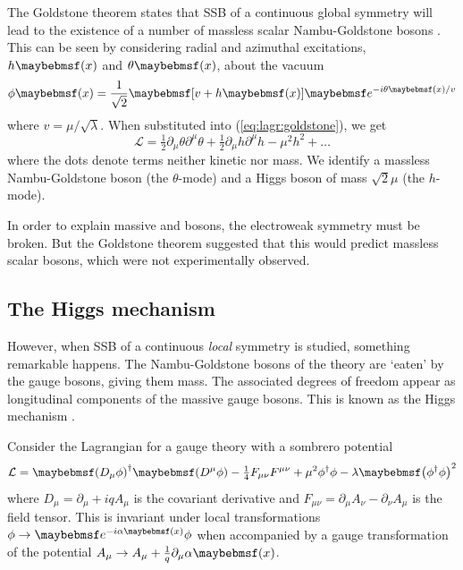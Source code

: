 The Goldstone theorem states that \ac{SSB} of a continuous global symmetry will lead to 
the existence of a number of massless scalar Nambu-Goldstone bosons \cite{Goldstone:1962}.
This can be seen by considering radial and azimuthal excitations, $h\parenths{x}$ and 
$\theta\parenths{x}$, about the vacuum 
\begin{equation}
	\phi\parenths{x} = \frac{1}{\sqrt{2}} \sqbracs{v + h\parenths{x}} \eexp{-i\theta\parenths{x} / v}
\end{equation}
where $v = \mu/\sqrt{\lambda}$. When substituted into (\ref{eq:lagr:goldstone}), we get
\begin{equation}
	\mathcal{L} = \tfrac{1}{2}\partial_{\mu}\theta \partial^{\mu}\theta
	+ \tfrac{1}{2}\partial_{\mu}h \partial^{\mu}h
	- \mu^2 h^2
	+ \dots
\end{equation}
where the dots denote terms neither kinetic nor mass. 
We identify a massless Nambu-Goldstone boson (the $\theta$-mode) and a Higgs boson of 
mass $\sqrt{2}\mu$ (the $h$-mode).

In order to explain massive \PWpm and \PZ bosons, the electroweak symmetry must be broken.
But the Goldstone theorem suggested that this would predict massless scalar bosons, which
were not experimentally observed.



\subsection{The Higgs mechanism}
\label{sec:ewsb:higgs}
However, when \ac{SSB} of a continuous \textit{local} symmetry is studied, something 
remarkable happens. The Nambu-Goldstone bosons of the theory are `eaten' by the gauge 
bosons, giving them mass. The associated degrees of freedom appear as longitudinal 
components of the massive gauge bosons. This is known as the Higgs mechanism 
\cite{Englert:1964,Higgs:1964a,Higgs:1964b,Guralnik:1964,Higgs:1966}.

Consider the Lagrangian for a  gauge theory with a sombrero potential
\begin{equation}
	\mathcal{L} 
	= \parenths{D_{\mu}\phi}^{\dagger} \parenths{D^{\mu}\phi}
	- \tfrac{1}{4} F_{\mu\nu} F^{\mu\nu}
	+ \mu^2 \phi^{\dagger} \phi - \lambda \parenths{\phi^{\dagger} \phi}^2
	\label{eq:lagr:abelHiggs}
\end{equation}
where $D_{\mu} = \partial_{\mu} + iqA_{\mu}$ is the covariant derivative and $F_{\mu\nu} 
= \partial_{\mu}A_{\nu} - \partial_{\nu}A_{\mu}$ is the field tensor. This is invariant 
under local  transformations $\phi \rightarrow \eexp{-i\alpha\parenths{x}} \phi$
when accompanied by a gauge transformation of the potential 
$A_{\mu} \rightarrow A_{\mu} + \tfrac{1}{q}\partial_{\mu} \alpha\parenths{x}$.

